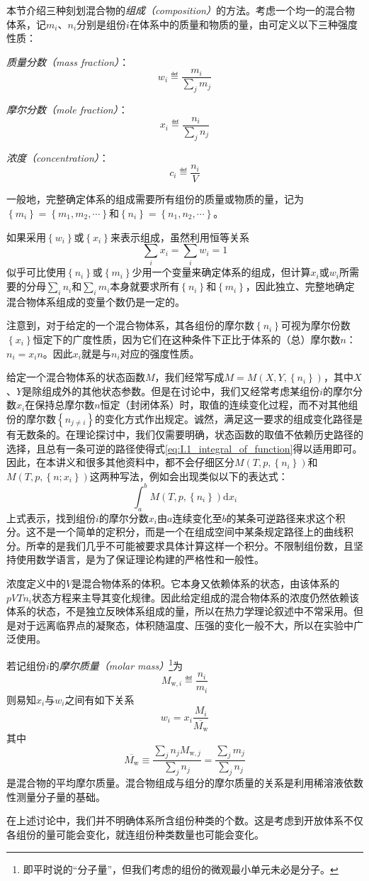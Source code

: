 \documentclass[main.tex]{subfiles}
\begin{document}
本节介绍三种刻划混合物的\emph{组成（composition）}的方法。考虑一个均一的混合物体系，记$m_i$、$n_i$分别是组份$i$在体系中的质量和物质的量，由可定义以下三种强度性质：

\emph{质量分数（mass fraction）}：
\[w_i\eqdef\frac{m_i}{\sum_jm_j}\]

\emph{摩尔分数（mole fraction）}：
\[x_i\eqdef\frac{n_i}{\sum_jn_j}\]

\emph{浓度（concentration）}：
\[c_i\eqdef\frac{n_i}{V}\]

一般地，完整确定体系的组成需要所有组份的质量或物质的量，记为$\left\{m_i\right\}=\left\{m_1,m_2,\cdots\right\}$和$\left\{n_i\right\}=\left\{n_1,n_2,\cdots\right\}$。

如果采用$\left\{w_i\right\}$或$\left\{x_i\right\}$来表示组成，虽然利用恒等关系
\[\sum_ix_i=\sum_iw_i=1\]
似乎可比使用$\left\{n_i\right\}$或$\left\{m_i\right\}$少用一个变量来确定体系的组成，但计算$x_i$或$w_i$所需要的分母$\sum_in_i$和$\sum_im_i$本身就要求所有$\left\{n_i\right\}$和$\left\{m_i\right\}$，因此独立、完整地确定混合物体系组成的变量个数仍是一定的。

注意到，对于给定的一个混合物体系，其各组份的摩尔数$\left\{n_i\right\}$可视为摩尔份数$\left\{x_i\right\}$恒定下的广度性质，因为它们在这种条件下正比于体系的（总）摩尔数$n$：$n_i=x_in$。因此$x_i$就是与$n_i$对应的强度性质。

给定一个混合物体系的状态函数$M$，我们经常写成$M=M\left(X,Y,\left\{n_i\right\}\right)$，其中$X$、$Y$是除组成外的其他状态参数。但是在讨论中，我们又经常考虑某组份$i$的摩尔分数$x_i$在保持总摩尔数$n$恒定（封闭体系）时，取值的连续变化过程，而不对其他组份的摩尔数$\left\{n_{j\neq i}\right\}$的变化方式作出规定。诚然，满足这一要求的组成变化路径是有无数条的。在理论探讨中，我们仅需要明确，状态函数的取值不依赖历史路径的选择，且总有一条可逆的路径使得式\eqref{eq:I.1_integral_of_function}得以适用即可。因此，在本讲义和很多其他资料中，都不会仔细区分$M\left(T,p,\left\{n_i\right\}\right)$和$M\left(T,p,\left\{n;x_i\right\}\right)$这两种写法，例如会出现类似以下的表达式：
\[\int_a^bM\left(T,p,\left\{n_i\right\}\right)\mathrm{d}x_i\]
上式表示，找到组份$i$的摩尔分数$x_i$由$a$连续变化至$b$的某条可逆路径来求这个积分。这不是一个简单的定积分，而是一个在组成空间中某条规定路径上的曲线积分。所幸的是我们几乎不可能被要求具体计算这样一个积分。不限制组份数，且坚持使用数学语言，是为了保证理论构建的严格性和一般性。

浓度定义中的$V$是混合物体系的体积。它本身又依赖体系的状态，由该体系的$pVTn_i$状态方程来主导其变化规律。因此给定组成的混合物体系的浓度仍然依赖该体系的状态，不是独立反映体系组成的量，所以在热力学理论叙述中不常采用。但是对于远离临界点的凝聚态，体积随温度、压强的变化一般不大，所以在实验中广泛使用。

若记组份$i$的\emph{摩尔质量（molar mass）}\footnote{即平时说的“分子量”，但我们考虑的组份的微观最小单元未必是分子。}为
\[M_{\text{w},i}\eqdef\frac{n_i}{m_i}\]
则易知$x_i$与$w_i$之间有如下关系
\[w_i=x_i\frac{M_i}{\overline{M_\text{w}}}\]
其中
\[\overline{M_\text{w}}\equiv\frac{\sum_jn_jM_{\text{w},j}}{\sum_jn_j}=\frac{\sum_jm_j}{\sum_jn_j}\]
是混合物的平均摩尔质量。混合物组成与组分的摩尔质量的关系是利用稀溶液依数性测量分子量的基础。

在上述讨论中，我们并不明确体系所含组份种类的个数。这是考虑到开放体系不仅各组份的量可能会变化，就连组份种类数量也可能会变化。
\end{document}
